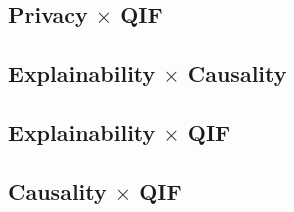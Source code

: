 \subsection{Privacy $\times$ QIF}

\subsection{Explainability $\times$ Causality}

\subsection{Explainability $\times$ QIF}

\subsection{Causality $\times$ QIF}

